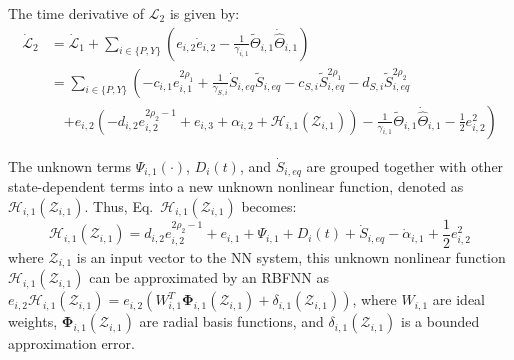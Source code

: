 The time derivative of $\mathcal{L}_2$ is given by:
\begin{align}
    \dot{\mathcal{L}}_2 &= \dot{\mathcal{L}}_1 + \sum_{i \in \{P,Y\}} \left( e_{i,2} \dot{e}_{i,2} - \frac{1}{\gamma_{i,1}} \widetilde{\Theta}_{i,1} \dot{\widehat{\Theta}}_{i,1} \right) \nonumber \\
    &= \sum_{i \in \{P,Y\}} \left( -c_{i,1} e_{i,1}^{2\rho_1} + \frac{1}{\gamma_{S,i}} \dot{S}_{i,eq} \widetilde{S}_{i,eq} - c_{S,i} \widetilde{S}_{i,eq}^{2\rho_1} - d_{S,i} \widetilde{S}_{i,eq}^{2\rho_2} \right. \nonumber \\
    &\quad \left. + e_{i,2} ( - d_{i,2} e_{i,2}^{2\rho_2-1} + e_{i,3} + \alpha_{i,2} + \mathcal{H}_{i,1}(\mathcal{Z}_{i,1})) - \frac{1}{\gamma_{i,1}} \widetilde{\Theta}_{i,1} \dot{\widehat{\Theta}}_{i,1} - \frac{1}{2} e_{i,2}^2 \right) \label{eq:L2_dot_expanded}
\end{align}

The unknown terms $\Psi_{i,1}(\cdot)$, $D_i(t)$, and $\dot{S}_{i,eq}$ are grouped together with other state-dependent terms into a new unknown nonlinear function, denoted as $\mathcal{H}_{i,1}(\mathcal{Z}_{i,1})$. Thus, Eq.~$\mathcal{H}_{i,1}(\mathcal{Z}_{i,1})$ becomes:
\begin{equation}
    \mathcal{H}_{i,1}(\mathcal{Z}_{i,1}) = d_{i,2} e_{i,2}^{2\rho_2-1} + e_{i,1} +  \Psi_{i,1} + D_i(t) + \dot{S}_{i,eq} - \dot{\alpha}_{i,1}    +\frac{1}{2} e^2_{i,2}\label{eq:e2_dot_H1}
\end{equation}
where $\mathcal{Z}_{i,1}$ is an input vector to the NN system, this unknown nonlinear function $\mathcal{H}_{i,1}(\mathcal{Z}_{i,1})$ can be approximated by an RBFNN as $e_{i,2} \mathcal{H}_{i,1}(\mathcal{Z}_{i,1}) =e_{i,2} \left( W_{i,1}^T \mathbf{\Phi}_{i,1}(\mathcal{Z}_{i,1}) + \delta_{i,1}(\mathcal{Z}_{i,1}) \right)$, where $W_{i,1}$ are ideal weights, $\mathbf{\Phi}_{i,1}(\mathcal{Z}_{i,1})$ are radial basis functions, and $\delta_{i,1}(\mathcal{Z}_{i,1})$ is a bounded approximation error.

